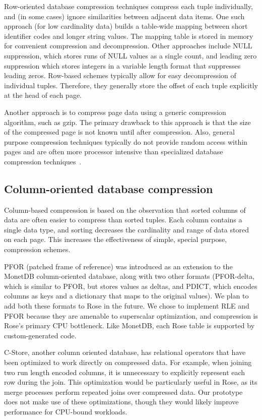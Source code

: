 \documentclass{vldb}
\newcommand{\rows}{Rose\xspace}
\newcommand{\rowss}{Rose's\xspace}
\begin{document}
Row-oriented database compression techniques compress each tuple
individually, and (in some cases) ignore similarities between adjacent
data items.  One such approach (for low cardinality data) builds a
table-wide mapping between short identifier codes and longer string
values. The mapping table is stored in memory for convenient
compression and decompression.  Other approaches include NULL
suppression, which stores runs of NULL values as a single count, and
leading zero suppression which stores integers in a variable length
format that suppresses leading zeros.  Row-based schemes typically
allow for easy decompression of individual tuples.  Therefore, they
generally store the offset of each tuple explicitly at the head of
each page.

Another approach is to compress page data using a generic compression
algorithm, such as gzip.  The primary drawback to this approach is
that the size of the compressed page is not known until after
compression.  Also, general purpose compression techniques typically
do not provide random access within pages and are often more processor
intensive than specialized database compression
techniques~\cite{rowImplementationPerf}.

\subsection{Column-oriented database compression}

Column-based compression is based on the observation that sorted
columns of data are often easier to compress than sorted tuples.  Each
column contains a single data type, and sorting decreases the
cardinality and range of data stored on each page.  This increases the
effectiveness of simple, special purpose, compression schemes.

PFOR (patched frame of reference) was introduced as an extension to
the MonetDB\cite{pfor} column-oriented database, along with two other
formats (PFOR-delta, which is similar to PFOR, but stores values as
deltas, and PDICT, which encodes columns as keys and a dictionary that
maps to the original values).  We plan to add both these formats to
\rows in the future.  We chose to implement RLE and PFOR because they
are amenable to superscalar optimization, and compression is \rowss
primary CPU bottleneck.  Like MonetDB, each \rows table is supported
by custom-generated code.

C-Store, another column oriented database, has relational operators
that have been optimized to work directly on compressed
data\cite{compExec}.  For example, when joining two run length encoded
columns, it is unnecessary to explicitly represent each row during the
join.  This optimization would be particularly useful in \rows, as its
merge processes perform repeated joins over compressed data.  Our
prototype does not make use of these optimizations, though they would
likely improve performance for CPU-bound workloads.
\end{document}
